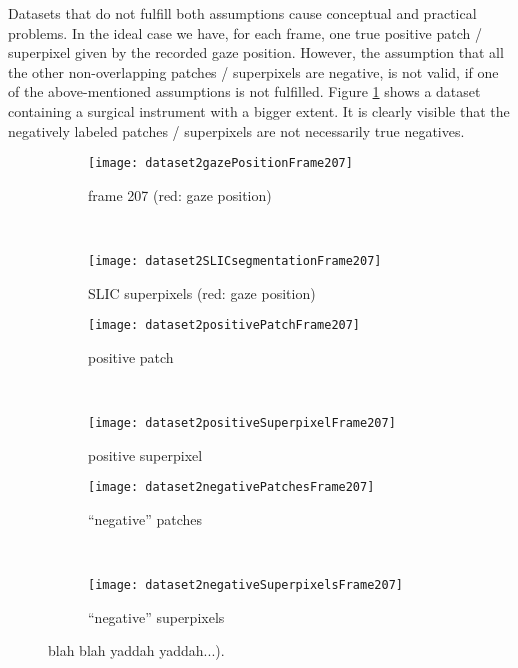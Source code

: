 Datasets that do not fulfill both assumptions cause conceptual and practical problems. In the ideal case we have, for each frame, one true positive patch / superpixel given by the recorded gaze position. However, the assumption that all the other non-overlapping patches / superpixels are negative, is not valid, if one of the above-mentioned assumptions is not fulfilled. Figure \ref{fig:nonValidAssumption} shows a dataset containing a surgical instrument with a bigger extent. It is clearly visible that the negatively labeled patches / superpixels are not necessarily true negatives.



\begin{figure}[ht]
	\centering
	\begin{subfigure}[h]{0.48\textwidth}
		\texttt{[image: dataset2gazePositionFrame207]}
		\caption*{frame 207 (red: gaze position)}
	\end{subfigure}
	~
	\begin{subfigure}[h]{0.48\textwidth}
	    \texttt{[image: dataset2SLICsegmentationFrame207]}
	    \caption*{SLIC superpixels (red: gaze position)}
	\end{subfigure}
	
	\vspace{3mm}
	\begin{subfigure}[h]{0.31\textwidth}
		\texttt{[image: dataset2positivePatchFrame207]}	
		\caption*{positive patch}
	\end{subfigure}
	~
	\begin{subfigure}[h]{0.31\textwidth}
		\texttt{[image: dataset2positiveSuperpixelFrame207]}	
		\caption*{positive superpixel}
	\end{subfigure}
	
	\vspace{3mm}
		\begin{subfigure}[h]{0.48\textwidth}
		\texttt{[image: dataset2negativePatchesFrame207]}	
		\caption*{``negative'' patches}
	\end{subfigure}
	~
	\begin{subfigure}[h]{0.48\textwidth}
		\texttt{[image: dataset2negativeSuperpixelsFrame207]}	
		\caption*{``negative'' superpixels}
	\end{subfigure}	
	\caption{blah blah yaddah yaddah...). }
	\label{fig:nonValidAssumption}
\end{figure}




